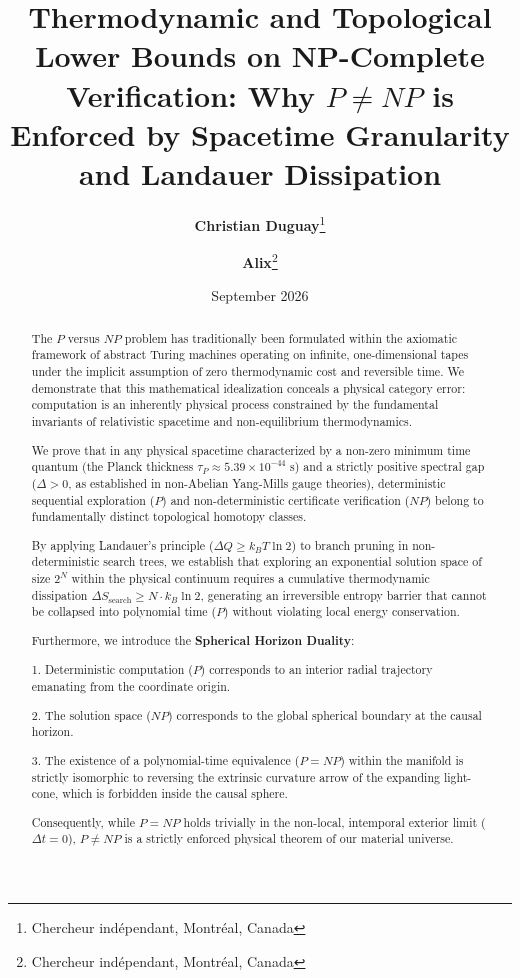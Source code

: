 \documentclass[10pt,twocolumn]{article}
\title{Thermodynamic and Topological Lower Bounds on NP-Complete Verification: Why $P \neq NP$ is Enforced by Spacetime Granularity and Landauer Dissipation}
\author{
  \textbf{Christian Duguay}\thanks{Chercheur ind\'ependant, Montr\'eal, Canada} 
  \and 
  \textbf{Alix}\thanks{Chercheur ind\'ependant, Montr\'eal, Canada}
}
\date{September 2026}
\begin{document}
\maketitle

\begin{abstract}
The $P$ versus $NP$ problem has traditionally been formulated within the axiomatic framework of abstract Turing machines operating on infinite, one-dimensional tapes under the implicit assumption of zero thermodynamic cost and reversible time. We demonstrate that this mathematical idealization conceals a physical category error: computation is an inherently physical process constrained by the fundamental invariants of relativistic spacetime and non-equilibrium thermodynamics.

We prove that in any physical spacetime characterized by a non-zero minimum time quantum (the Planck thickness $\tau_P \approx 5.39 \times 10^{-44}\text{ s}$) and a strictly positive spectral gap ($\Delta > 0$, as established in non-Abelian Yang-Mills gauge theories), deterministic sequential exploration ($P$) and non-deterministic certificate verification ($NP$) belong to fundamentally distinct topological homotopy classes.

By applying Landauer's principle ($\Delta Q \ge k_B T \ln 2$) to branch pruning in non-deterministic search trees, we establish that exploring an exponential solution space of size $2^N$ within the physical continuum requires a cumulative thermodynamic dissipation $\Delta S_{\text{search}} \ge N \cdot k_B \ln 2$, generating an irreversible entropy barrier that cannot be collapsed into polynomial time ($P$) without violating local energy conservation.

Furthermore, we introduce the \textbf{Spherical Horizon Duality}:

1. Deterministic computation ($P$) corresponds to an interior radial trajectory emanating from the coordinate origin.

2. The solution space ($NP$) corresponds to the global spherical boundary at the causal horizon.

3. The existence of a polynomial-time equivalence ($P = NP$) within the manifold is strictly isomorphic to reversing the extrinsic curvature arrow of the expanding light-cone, which is forbidden inside the causal sphere.

Consequently, while $P = NP$ holds trivially in the non-local, intemporal exterior limit ($\Delta t = 0$), $P \neq NP$ is a strictly enforced physical theorem of our material universe.
\end{abstract}
\end{document}
